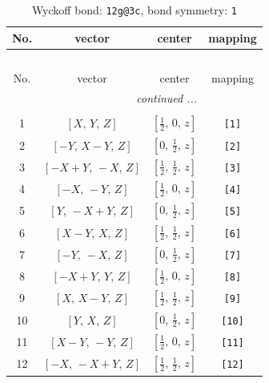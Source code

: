 \documentclass[fleqn,8pt]{jsarticle}
\begin{document}
\begin{longtable}{cccc}
\caption{Wyckoff bond: {\tt 12g@3c}, bond symmetry: {\tt 1}}
 \\
 \hline \hline
No. & vector & center & mapping \\ \hline \endfirsthead

\multicolumn{3}{l}{\tablename\ \thetable{}} \\
 \hline \hline
No. & vector & center & mapping \\ \hline \endhead

 \hline \hline
\multicolumn{3}{r}{\footnotesize\it continued ...} \\ \endfoot

 \hline \hline
\multicolumn{3}{r}{} \\ \endlastfoot

1 & $\left[ X,\, Y,\, Z \right]$ & $\left[ \frac{1}{2},\, 0,\, z \right]$ & {\tt [1]} \\ \hline
2 & $\left[ - Y,\, X - Y,\, Z \right]$ & $\left[ 0,\, \frac{1}{2},\, z \right]$ & {\tt [2]} \\ \hline
3 & $\left[ - X + Y,\, - X,\, Z \right]$ & $\left[ \frac{1}{2},\, \frac{1}{2},\, z \right]$ & {\tt [3]} \\ \hline
4 & $\left[ - X,\, - Y,\, Z \right]$ & $\left[ \frac{1}{2},\, 0,\, z \right]$ & {\tt [4]} \\ \hline
5 & $\left[ Y,\, - X + Y,\, Z \right]$ & $\left[ 0,\, \frac{1}{2},\, z \right]$ & {\tt [5]} \\ \hline
6 & $\left[ X - Y,\, X,\, Z \right]$ & $\left[ \frac{1}{2},\, \frac{1}{2},\, z \right]$ & {\tt [6]} \\ \hline
7 & $\left[ - Y,\, - X,\, Z \right]$ & $\left[ 0,\, \frac{1}{2},\, z \right]$ & {\tt [7]} \\ \hline
8 & $\left[ - X + Y,\, Y,\, Z \right]$ & $\left[ \frac{1}{2},\, 0,\, z \right]$ & {\tt [8]} \\ \hline
9 & $\left[ X,\, X - Y,\, Z \right]$ & $\left[ \frac{1}{2},\, \frac{1}{2},\, z \right]$ & {\tt [9]} \\ \hline
10 & $\left[ Y,\, X,\, Z \right]$ & $\left[ 0,\, \frac{1}{2},\, z \right]$ & {\tt [10]} \\ \hline
11 & $\left[ X - Y,\, - Y,\, Z \right]$ & $\left[ \frac{1}{2},\, 0,\, z \right]$ & {\tt [11]} \\ \hline
12 & $\left[ - X,\, - X + Y,\, Z \right]$ & $\left[ \frac{1}{2},\, \frac{1}{2},\, z \right]$ & {\tt [12]} \\
\end{longtable}
\end{document}
